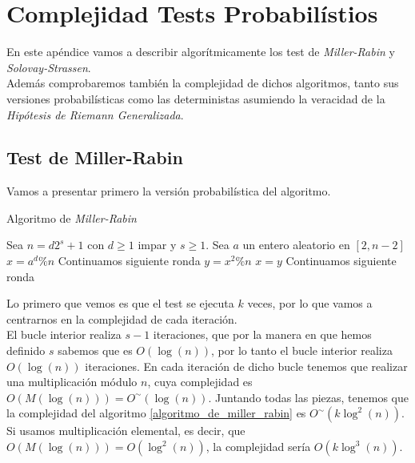 
\chapter{Complejidad Tests Probabilístios}\label{complejidad_tests_probabilisticos}

En este apéndice vamos a describir algorítmicamente los test de \textit{Miller-Rabin} y \textit{Solovay-Strassen}.\\

Además comprobaremos también la complejidad de dichos algoritmos, tanto sus versiones probabilísticas como las deterministas asumiendo la veracidad de la \textit{Hipótesis de Riemann Generalizada}.

\section{Test de Miller-Rabin}

Vamos a presentar primero la versión probabilística del algoritmo.

\begin{algorithm}[H]
	\caption{Algoritmo de \textit{Miller-Rabin}}\label{algoritmo_de_miller_rabin}
	\begin{algorithmic}[1]
			\State Sea $n = d2^s + 1$ con $d \geq 1$ impar y $s \geq 1$.
				\State Sea $a$ un entero aleatorio en $[2, n-2]$
				\State $x = a^d \% n$
					\State Continuamos siguiente ronda
				\EndIf
					\State $y = x^2 \% n$
						\State {}
					\EndIf
					\State $x = y$
						\State Continuamos siguiente ronda
					\EndIf
				\EndFor
				\State {}
			\EndFor
			\State {}
		\EndProcedure
	\end{algorithmic}
\end{algorithm}

Lo primero que vemos es que el test se ejecuta $k$ veces, por lo que vamos a centrarnos en la complejidad de cada iteración.\\

El bucle interior realiza $s-1$ iteraciones, que por la manera en que hemos definido $s$ sabemos que es $O(\log(n))$, por lo tanto el bucle interior realiza $O(\log(n))$ iteraciones. En cada iteración de dicho bucle tenemos que realizar una multiplicación módulo $n$, cuya complejidad es $O(M(\log(n))) = O^\sim(\log(n))$. Juntando todas las piezas, tenemos que la complejidad del algoritmo \autoref{algoritmo_de_miller_rabin} es $O^\sim(k\log^2(n))$. Si usamos multiplicación elemental, es decir, que $O(M(\log(n))) = O(\log^2(n))$, la complejidad sería $O(k\log^3(n))$.\\

